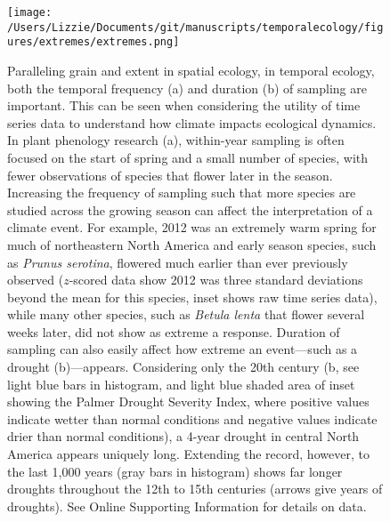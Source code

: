 \documentclass[11pt,a4paper,oneside]{article}
\begin{document}
\newpage
\begin{figure}[h!]
\centering
\noindent \texttt{[image: /Users/Lizzie/Documents/git/manuscripts/temporalecology/figures/extremes/extremes.png]}
\caption{Paralleling grain and extent in spatial ecology, in temporal ecology, both the temporal frequency (a) and duration (b) of sampling are important. This can be seen when considering the utility of time series data to understand how climate impacts ecological dynamics. In plant phenology research (a), within-year sampling is often focused on the start of spring and a small number of species, with fewer observations of species that flower later in the season. Increasing the frequency of sampling such that more species are studied across the growing season can affect the interpretation of a climate event. For example, 2012 was an extremely warm spring for much of northeastern North America and early season species, such as \emph{Prunus serotina}, flowered much earlier than ever previously observed ($z$-scored data show 2012 was three standard deviations beyond the mean for this species, inset shows raw time series data), while many other species, such as \emph{Betula lenta} that flower several weeks later, did not show as extreme a response. Duration of sampling can also easily affect how extreme an event---such as a drought (b)---appears. Considering only the 20th century (b, see light blue bars in histogram, and light blue shaded area of inset showing the Palmer Drought Severity Index, where positive values indicate wetter than normal conditions and negative values indicate drier than normal conditions), a 4-year drought in central North America appears uniquely long. Extending the record, however, to the last 1,000 years (gray bars in histogram) shows far longer droughts throughout the 12th to 15th centuries (arrows give years of droughts). See Online Supporting Information for details on data.}
\end{figure}
\end{document}
